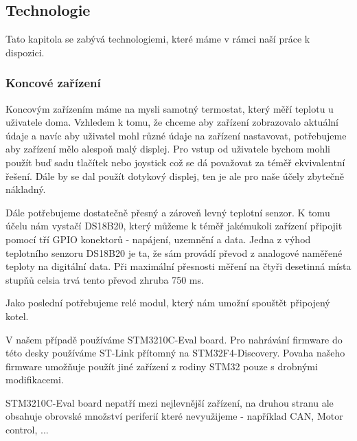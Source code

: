 \subsection{Technologie}
Tato kapitola se zabývá technologiemi, které máme v rámci naší práce k dispozici.

\subsubsection{Koncové zařízení}
Koncovým zařízením máme na mysli samotný termostat, který měří teplotu u uživatele doma.
Vzhledem k tomu, že chceme aby zařízení zobrazovalo aktuální údaje a navíc aby uživatel mohl
různé údaje na zařízení nastavovat, potřebujeme aby zařízení mělo alespoň malý displej.
Pro vstup od uživatele bychom mohli použít buď sadu tlačítek nebo joystick což se dá považovat
za téměř ekvivalentní řešení.
Dále by se dal použít dotykový displej, ten je ale pro naše účely zbytečně nákladný.

Dále potřebujeme dostatečně přesný a zároveň levný teplotní senzor.
K tomu účelu nám vystačí DS18B20, který můžeme k téměř jakémukoli zařízení připojit pomocí tří
GPIO konektorů - napájení, uzemnění a data.
Jedna z výhod teplotního senzoru DS18B20 je ta, že sám provádí převod z analogové naměřené
teploty na digitální data.
Při maximální přesnosti měření na čtyři desetinná místa stupňů celsia trvá tento převod zhruba
750 ms.

Jako poslední potřebujeme relé modul, který nám umožní spouštět připojený kotel.


V našem případě používáme STM3210C-Eval board.
Pro nahrávání firmware do této desky používáme ST-Link přítomný na STM32F4-Discovery.
Povaha našeho firmware umožňuje použít jiné zařízení z rodiny STM32 pouze s drobnými modifikacemi.

STM3210C-Eval board nepatří mezi nejlevnější zařízení, na druhou stranu ale obsahuje obrovské
množství periferií které nevyužijeme - například CAN, Motor control, ...



